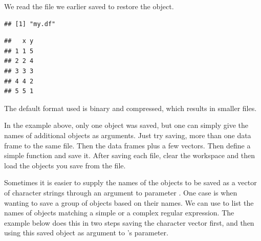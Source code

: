 \documentclass[krantz2]{krantz}\usepackage{knitr}%
\begin{document}
We read the file we earlier saved to restore the object.

\begin{knitrout}\footnotesize
{}\color{fgcolor}\begin{kframe}
\begin{alltt}
\hlstd{(} \hlstd{=} \hlstd{)}
\hlstd{(} \hlstd{=} \hlstd{)}
\end{alltt}
\begin{verbatim}
## [1] "my.df"
\end{verbatim}
\begin{alltt}
\end{alltt}
\begin{verbatim}
##   x y
## 1 1 5
## 2 2 4
## 3 3 3
## 4 4 2
## 5 5 1
\end{verbatim}
\end{kframe}
\end{knitrout}

The default format used is binary and compressed, which results in smaller files.

\begin{playground}
In the example above, only one object was saved, but one can simply give the names of additional objects as arguments. Just try saving, more than one data frame to the same file. Then the data frames plus a few vectors. Then define a simple function and save it. After saving each file, clear the workspace and then load the objects you save from the file.
\end{playground}

Sometimes it is easier to supply the names of the objects to be saved as a vector of character strings through an argument to parameter . One case is when wanting to save a group of objects based on their names. We can use  to list the names of objects matching a simple  or a complex regular expression. The example below does this in two steps saving the character vector first, and then using this saved object as argument to 's  parameter.

\begin{knitrout}\footnotesize
{}\color{fgcolor}\begin{kframe}
\begin{alltt}
 \hlkwb{<-} \hlstd{(} \hlstd{=} \hlstd{)}
\hlstd{(}   \hlstd{=} \hlstd{)}
\end{alltt}
\end{kframe}
\end{knitrout}
\end{document}
